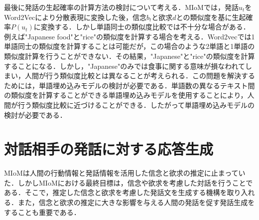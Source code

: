 \par
最後に発話の生起確率の計算方法の検討について考える．MIoMでは，発話$u_t$をWord2Vecにより分散表現に変換した後，信念$b_t$と欲求$d$との類似度を基に生起確率$P(u_t)$に変換する．しかし単語同士の類似度比較では不十分な場合がある．例えば"Japanese food"と"rice"の類似度を計算する場合を考える．Word2vecでは1単語同士の類似度を計算することは可能だが，この場合のような2単語と1単語の類似度計算を行うことができない．その結果，"Japanese"と"rice"の類似度を計算することになる．しかし，"Japanese"のみでは食事に関する意味が損なわれてしまい，人間が行う類似度比較とは異なることが考えられる．この問題を解決するためには，単語埋め込みモデルの検討が必要である．単語数の異なるテキスト間の類似度を計算することができる単語埋め込みモデルを使用することにより，人間が行う類似度比較に近づけることができる．したがって単語埋め込みモデルの検討が必要である．


\section{対話相手の発話に対する応答生成}

MIoMは人間の行動情報と発話情報を活用した信念と欲求の推定に止まっていた．しかしMIoMにおける最終目標は，信念や欲求を考慮した対話を行うことである．そこで，推定した信念と欲求を考慮した発話文を生成する機構を取り入れる．また，信念と欲求の推定に大きな影響を与える人間の発話を促す発話生成をすることも重要である．
